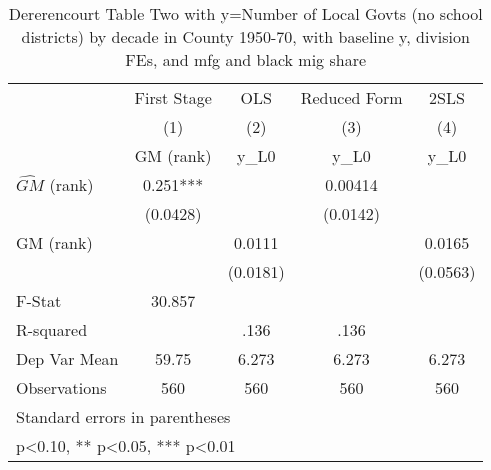 \begin{table}[htbp]\centering
\def\sym#1{\ifmmode^{#1}\else\(^{#1}\)\fi}
\caption{Dererencourt Table Two with y=Number of Local Govts (no school districts) by decade in County 1950-70, with baseline y, division FEs, and mfg and black mig share}
\begin{tabular}{l*{4}{c}}
\toprule
                    & First Stage   &         OLS   &Reduced Form   &        2SLS   \\
                    &\multicolumn{1}{c}{(1)}&\multicolumn{1}{c}{(2)}&\multicolumn{1}{c}{(3)}&\multicolumn{1}{c}{(4)}\\
                    &\multicolumn{1}{c}{GM  (rank)}&\multicolumn{1}{c}{y\_L0}&\multicolumn{1}{c}{y\_L0}&\multicolumn{1}{c}{y\_L0}\\
\midrule
$\hat{GM}$ (rank)   &       0.251***&               &     0.00414   &               \\
                    &    (0.0428)   &               &    (0.0142)   &               \\
\addlinespace
GM  (rank)          &               &      0.0111   &               &      0.0165   \\
                    &               &    (0.0181)   &               &    (0.0563)   \\
\midrule
F-Stat              &      30.857   &               &               &               \\
R-squared           &               &        .136   &        .136   &               \\
Dep Var Mean        &       59.75   &       6.273   &       6.273   &       6.273   \\
Observations        &         560   &         560   &         560   &         560   \\
\bottomrule
\multicolumn{5}{l}{\footnotesize Standard errors in parentheses}\\
\multicolumn{5}{l}{\footnotesize * p<0.10, ** p<0.05, *** p<0.01}\\
\end{tabular}
\end{table}
